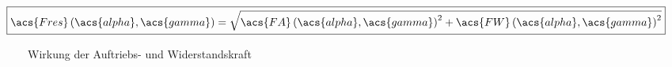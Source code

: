 \begin{equation}\label{eq:Gleichung2.27}
    \boxed{\acs{Fres}\left(\acs{alpha}, \acs{gamma}\right) = \sqrt{\acs{FA}\left(\acs{alpha}, \acs{gamma}\right)^2 + \acs{FW}\left(\acs{alpha}, \acs{gamma}\right)^2}}
\end{equation}
\begin{figure}[H]
   \centering
   \caption[Wirkung der Auftriebs- und Widerstandskraft]{Wirkung der Auftriebs- und Widerstandskraft \cite{SkriptSchulte}}
   \label{fig:Bild2.10}
\end{figure}

